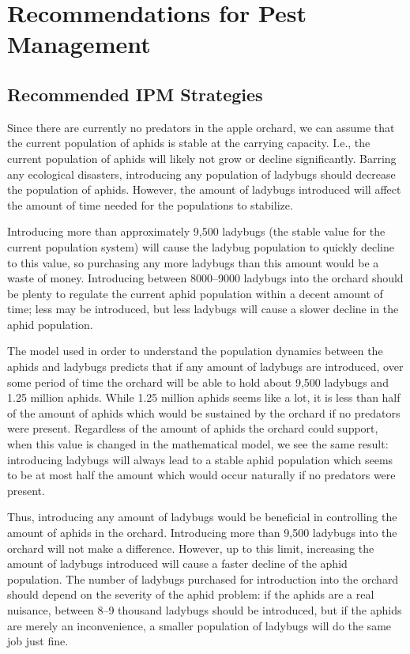 \documentclass[10pt]{article}
\newcommand{\np}{\vfill\newpage}
\begin{document}
\np

\setcounter{tocdepth}{1}

\section{Recommendations for Pest Management}

\subsection{Recommended IPM Strategies}

Since there are currently no predators in the apple orchard, we can assume that the current population of aphids is stable at the carrying capacity. I.e., the current population of aphids will likely not grow or decline significantly. Barring any ecological disasters, introducing any population of ladybugs should decrease the population of aphids. However, the amount of ladybugs introduced will affect the amount of time needed for the populations to stabilize.

Introducing more than approximately 9,500 ladybugs (the stable value for the current population system) will cause the ladybug population to quickly decline to this value, so purchasing any more ladybugs than this amount would be a waste of money. Introducing between 8000--9000 ladybugs into the orchard should be plenty to regulate the current aphid population within a decent amount of time; less may be introduced, but less ladybugs will cause a slower decline in the aphid population.

The model used in order to understand the population dynamics between the aphids and ladybugs predicts that if any amount of ladybugs are introduced, over some period of time the orchard will be able to hold about 9,500 ladybugs and 1.25 million aphids. While 1.25 million aphids seems like a lot, it is less than half of the amount of aphids which would be sustained by the orchard if no predators were present. Regardless of the amount of aphids the orchard could support, when this value is changed in the mathematical model, we see the same result: introducing ladybugs will always lead to a stable aphid population which seems to be at most half the amount which would occur naturally if no predators were present.

Thus, introducing any amount of ladybugs would be beneficial in controlling the amount of aphids in the orchard. Introducing more than 9,500 ladybugs into the orchard will not make a difference. However, up to this limit, increasing the amount of ladybugs introduced will cause a faster decline of the aphid population. The number of ladybugs purchased for introduction into the orchard should depend on the severity of the aphid problem: if the aphids are a real nuisance, between 8--9 thousand ladybugs should be introduced, but if the aphids are merely an inconvenience, a smaller population of ladybugs will do the same job just fine.
\end{document}
